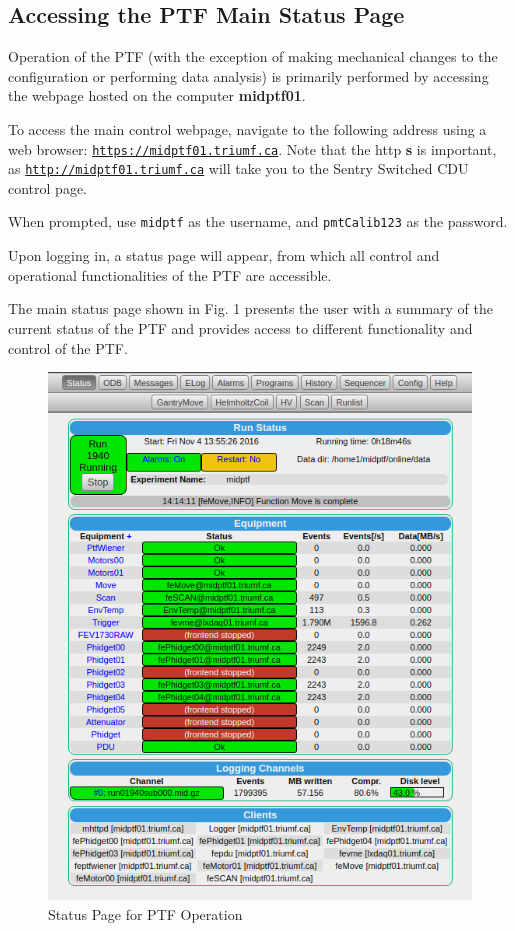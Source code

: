 \documentclass[twoside,letterpaper]{refart}
\begin{document}
\subsection{Accessing the PTF Main Status Page}

Operation of the PTF (with the exception of making mechanical changes to the configuration or performing data analysis) is primarily performed by accessing the webpage hosted on the computer \textbf{midptf01}.

To access the main control webpage, navigate to the following address using a web browser: \href{https://midptf01.triumf.ca}{\texttt{https://midptf01.triumf.ca}}. Note that the http \textbf{s} is important, as \href{http://midptf01.triumf.ca}{\texttt{http://midptf01.triumf.ca}} will take you to the Sentry Switched CDU control page.

When prompted, use \texttt{midptf} as the username, and \texttt{pmtCalib123} as the password.

Upon logging in, a status page will appear, from which all control and operational functionalities of the PTF are accessible.

The main status page shown in Fig. 1 presents the user with a summary of the current status of the PTF and provides access to different functionality and control of the PTF.

\begin{figure}[!htpb]\centering	
	\includegraphics[width=\textwidth]{images/midptfStatusPage.png}
	\caption{Status Page for PTF Operation\label{statusPage}}
\end{figure}
\end{document}
